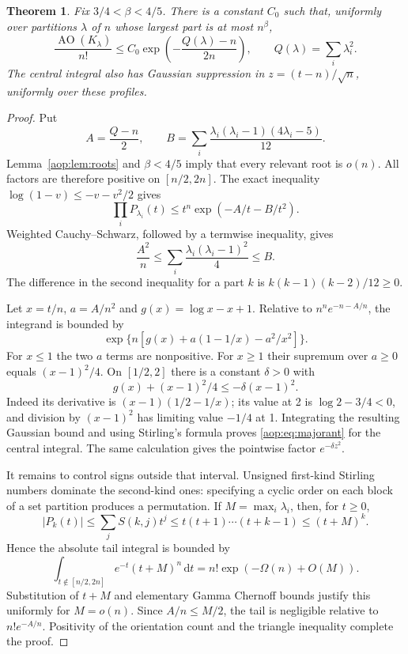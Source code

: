 \documentclass[11pt]{article}
\newtheorem{theorem}{Theorem}[section]
\theoremstyle{remark}\newtheorem{remark}[theorem]{Remark}
\newcommand{\AO}{\operatorname{AO}}
\newcommand{\dd}{\,\mathrm d}
\begin{document}
\begin{theorem}\label{aop:thm:majorant}
Fix $3/4<\beta<4/5$. There is a constant $C_0$ such that, uniformly over
partitions $\lambda$ of $n$ whose largest part is at most $n^\beta$,
\begin{equation}\label{aop:eq:majorant}
 \frac{\AO(K_\lambda)}{n!}\le C_0
      \exp\left(-\frac{Q(\lambda)-n}{2n}\right),\qquad
 Q(\lambda)=\sum_i\lambda_i^2.
\end{equation}
The central integral also has Gaussian suppression in
$z=(t-n)/\sqrt n$, uniformly over these profiles.
\end{theorem}
\begin{proof}
Put
\[
 A=\frac{Q-n}{2},\qquad
 B=\sum_i\frac{\lambda_i(\lambda_i-1)(4\lambda_i-5)}{12}.
\]
Lemma~\ref{aop:lem:roots} and $\beta<4/5$ imply that every relevant root is
$o(n)$. All factors are therefore positive on $[n/2,2n]$. The exact
inequality $\log(1-v)\le-v-v^2/2$ gives
\begin{equation}\label{aop:eq:rootmajorant}
 \prod_iP_{\lambda_i}(t)\le t^n\exp(-A/t-B/t^2).
\end{equation}
Weighted Cauchy--Schwarz, followed by a termwise inequality, gives
\[
 \frac{A^2}{n}\le\sum_i\frac{\lambda_i(\lambda_i-1)^2}{4}\le B.
\]
The difference in the second inequality for a part $k$ is
$k(k-1)(k-2)/12\ge0$.

Let $x=t/n$, $a=A/n^2$ and $g(x)=\log x-x+1$. Relative to
$n^ne^{-n-A/n}$, the integrand is bounded by
\[
 \exp\{n[g(x)+a(1-1/x)-a^2/x^2]\}.
\]
For $x\le1$ the two $a$ terms are nonpositive. For $x\ge1$ their
supremum over $a\ge0$ equals $(x-1)^2/4$. On $[1/2,2]$ there is a
constant $\delta>0$ with
\begin{equation}\label{aop:eq:gaussmajorant}
 g(x)+(x-1)^2/4\le-\delta(x-1)^2.
\end{equation}
Indeed its derivative is $(x-1)(1/2-1/x)$; its value at 2 is
$\log2-3/4<0$, and division by $(x-1)^2$ has limiting value $-1/4$
at 1. Integrating the resulting Gaussian bound and using Stirling's
formula proves \eqref{aop:eq:majorant} for the central integral. The same
calculation gives the pointwise factor $e^{-\delta z^2}$.

It remains to control signs outside that interval. Unsigned first-kind
Stirling numbers dominate the second-kind ones: specifying a cyclic
order on each block of a set partition produces a permutation. If
$M=\max_i\lambda_i$, then, for $t\ge0$,
\[
 |P_k(t)|\le\sum_jS(k,j)t^j
 \le t(t+1)\cdots(t+k-1)\le(t+M)^k.
\]
Hence the absolute tail integral is bounded by
\[
 \int_{t\notin[n/2,2n]}e^{-t}(t+M)^n\dd t
      =n!\exp(-\Omega(n)+O(M)).
\]
Substitution of $t+M$ and elementary Gamma Chernoff bounds justify this
uniformly for $M=o(n)$. Since $A/n\le M/2$, the tail is negligible
relative to $n!e^{-A/n}$. Positivity of the orientation count and the
triangle inequality complete the proof.
\end{proof}
\end{document}
